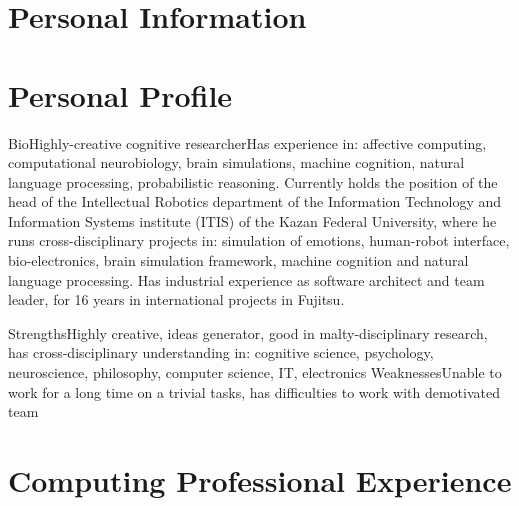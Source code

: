 \documentclass{moderncv}
\begin{document}

\section{Personal Information}
 
\section{Personal Profile}

\cventry
{Bio}{Highly-creative cognitive researcher}{}{}{}{Has experience in: affective computing, computational neurobiology, brain simulations, machine cognition, natural language processing, probabilistic reasoning. Currently holds the position of the head of the Intellectual Robotics department of the Information Technology and Information Systems institute (ITIS) of the Kazan Federal University, where he runs cross-disciplinary projects in: simulation of emotions, human-robot interface, bio-electronics, brain simulation framework, machine cognition and natural language processing. Has industrial experience as software architect and team leader, for 16 years in international projects in Fujitsu.}

\cvcomputer
{Strengths}{Highly creative, ideas generator, good in malty-disciplinary research, has cross-disciplinary understanding in: cognitive science, psychology, neuroscience, philosophy, computer science, IT, electronics}
{Weaknesses}{Unable to work for a long time on a trivial tasks, has difficulties to work with demotivated team}

\section{Computing Professional Experience}

\end{document}
